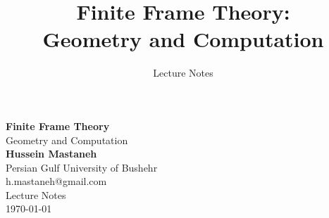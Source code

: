 \documentclass[11pt]{book}
\title{\textbf{Finite Frame Theory:\\Geometry and Computation}}
\author{Lecture Notes}
\date{}
\theoremstyle{plain}
\theoremstyle{definition}
\theoremstyle{remark}
\begin{document}
	
	\begin{titlepage}
		\centering
		\vspace*{2cm}
		{\Huge \textbf{Finite Frame Theory}}\\[0.5cm]
		{\Large Geometry and Computation}\\[2cm]
		{\LARGE \textbf{Hussein Mastaneh}}\\[0.3cm]
		{\Large Persian Gulf University of Bushehr}\\[1cm]
		{\large h.mastaneh@gmail.com}\\[3cm]
		{\large Lecture Notes}\\[1cm]
		\vfill
		{\large \today}
	\end{titlepage}
	
	\tableofcontents
	\newpage













\end{document}
